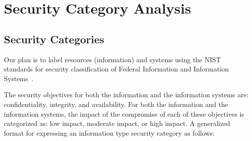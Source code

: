 \documentclass{sig-alternate}
\begin{document}

\section{Security Category Analysis}
\subsection{Security Categories}

Our plan is to label resources (information) and systems using the NIST standards for security classification of Federal Information and Information Systems~\cite{FIPS199}.

The security objectives for both the information and the information systems are: confidentiality, integrity, and availability.  For both the information and the information systems, the impact of the compromise of each of these objectives is categorized as: low impact, moderate impact, or high impact.  A generalized format for expressing an information type security category as follows:
\end{document}
